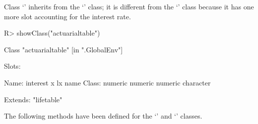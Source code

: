 \documentclass[nojss]{jss}
\begin{document}
Class `' inherits from the `' class; it
is different from the `' class because it has one more
slot accounting for the interest rate.

\begin{Schunk}
\begin{Sinput}
R> showClass("actuarialtable")
\end{Sinput}
\begin{Soutput}
Class "actuarialtable" [in ".GlobalEnv"]

Slots:
                                              
Name:   interest         x        lx      name
Class:   numeric   numeric   numeric character

Extends: "lifetable"
\end{Soutput}
\end{Schunk}

The following methods have been defined for the `' and
`' classes.
\end{document}
